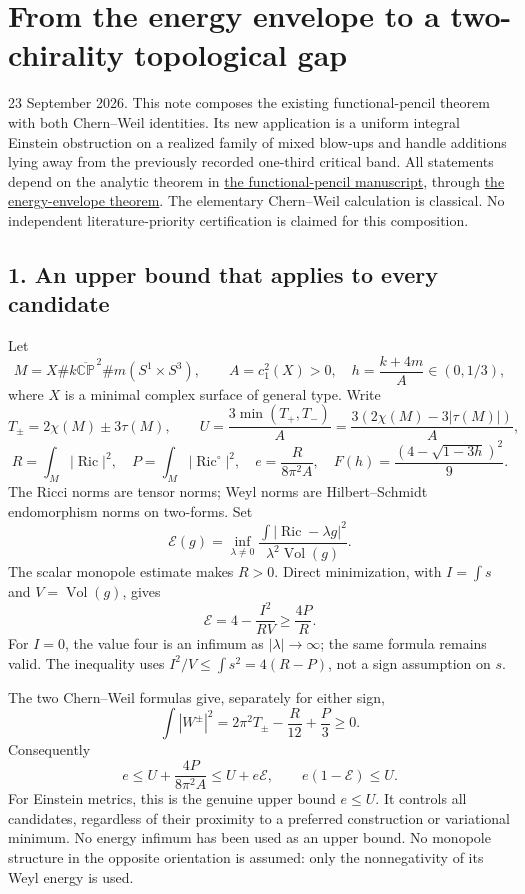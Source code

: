 \documentclass[
  11pt,
]{article}
\author{}
\date{23 September 2026}
\begin{document}
\hypertarget{from-the-energy-envelope-to-a-two-chirality-topological-gap}{%
\section{From the energy envelope to a two-chirality topological
gap}\label{from-the-energy-envelope-to-a-two-chirality-topological-gap}}

23 September 2026. This note composes the existing functional-pencil
theorem with both Chern--Weil identities. Its new application is a
uniform integral Einstein obstruction on a realized family of mixed
blow-ups and handle additions lying away from the previously recorded
one-third critical band. All statements depend on the analytic theorem
in \href{line1_functional_pencil.md}{the functional-pencil manuscript},
through \href{line1_energy_envelope_gap.md}{the energy-envelope
theorem}. The elementary Chern--Weil calculation is classical. No
independent literature-priority certification is claimed for this
composition.

\hypertarget{an-upper-bound-that-applies-to-every-candidate}{%
\subsection{1. An upper bound that applies to every
candidate}\label{an-upper-bound-that-applies-to-every-candidate}}

Let \[
 M=X\#k\overline{\mathbb{CP}}^{\,2}\#m(S^1\times S^3),\qquad
 A=c_1^2(X)>0,\quad h=\frac{k+4m}{A}\in(0,1/3),
 \tag{1}
\] where \(X\) is a minimal complex surface of general type. Write \[
 T_\pm=2\chi(M)\pm3\tau(M),\qquad
 U=\frac{3\min(T_+,T_-)}{A}
   =\frac{3(2\chi(M)-3|\tau(M)|)}{A},
\] \[
 R=\int_M|\operatorname{Ric}|^2,\quad
 P=\int_M|\operatorname{Ric}^{\circ}|^2,\quad
 e=\frac{R}{8\pi^2A},\quad
 F(h)=\frac{(4-\sqrt{1-3h})^2}{9}.
 \tag{2}
\] The Ricci norms are tensor norms; Weyl norms are Hilbert--Schmidt
endomorphism norms on two-forms. Set \[
 \mathcal E(g)=\inf_{\lambda\ne0}
 \frac{\int|\operatorname{Ric}-\lambda g|^2}
      {\lambda^2\operatorname{Vol}(g)}.
 \tag{3}
\] The scalar monopole estimate makes \(R>0\). Direct minimization, with
\(I=\int s\) and \(V=\operatorname{Vol}(g)\), gives \[
 \mathcal E=4-\frac{I^2}{RV}\ge\frac{4P}{R}.
 \tag{4}
\] For \(I=0\), the value four is an infimum as \(|\lambda|\to\infty\);
the same formula remains valid. The inequality uses
\(I^2/V\le\int s^2=4(R-P)\), not a sign assumption on \(s\).

The two Chern--Weil formulas give, separately for either sign, \[
 \int|W^\pm|^2=2\pi^2T_\pm-\frac{R}{12}+\frac P3\ge0.
\] Consequently \[
 e\le U+\frac{4P}{8\pi^2A}\le U+e\mathcal E,
 \qquad\boxed{e(1-\mathcal E)\le U.}
 \tag{5}
\] For Einstein metrics, this is the genuine upper bound \(e\le U\). It
controls all candidates, regardless of their proximity to a preferred
construction or variational minimum. No energy infimum has been used as
an upper bound. No monopole structure in the opposite orientation is
assumed: only the nonnegativity of its Weyl energy is used.
\end{document}
